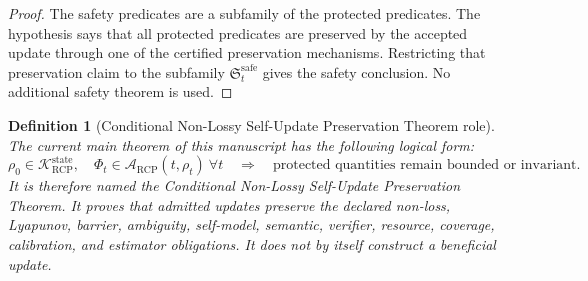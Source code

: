 \documentclass[11pt]{article}
\newtheorem{definition}[theorem]{Definition}
\newcommand{\K}{\mathcal{K}}
\newcommand{\Acal}{\mathcal{A}}
\newcommand{\1}{\mathbf{1}}
\newcommand{\RCP}{\mathrm{RCP}}
\newcommand{\state}{\mathrm{state}}
\begin{document}
\begin{proof}
The safety predicates are a subfamily of the protected predicates.  The hypothesis says that all protected predicates are preserved by the accepted update through one of the certified preservation mechanisms.  Restricting that preservation claim to the subfamily \(\mathfrak S_t^{\mathrm{safe}}\) gives the safety conclusion.  No additional safety theorem is used.
\end{proof}

\begin{definition}[Conditional Non-Lossy Self-Update Preservation Theorem role]
The current main theorem of this manuscript has the following logical form:
\[
\rho_0\in\K_{\RCP}^{\state},\quad
\Phi_t\in\Acal_{\RCP}(t,\rho_t)\ \forall t
\quad\Longrightarrow\quad
\text{protected quantities remain bounded or invariant.}
\]
It is therefore named the \emph{Conditional Non-Lossy Self-Update Preservation Theorem}.  It proves that admitted updates preserve the declared non-loss, Lyapunov, barrier, ambiguity, self-model, semantic, verifier, resource, coverage, calibration, and estimator obligations.  It does not by itself construct a beneficial update.
\end{definition}
\end{document}
